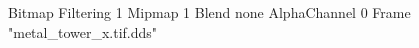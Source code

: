 {Bitmap
	{Filtering 1}
	{Mipmap 1}
	{Blend none}
	{AlphaChannel 0}
	{Frame "metal_tower_x.tif.dds"}
}
